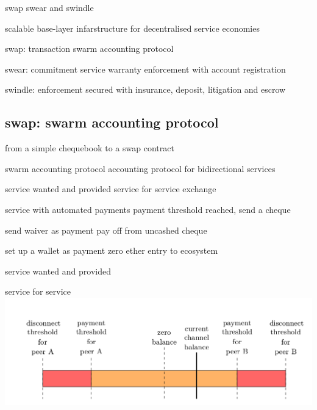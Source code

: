 \documentclass{beamer}
\begin{document}
\begin{frame}{swap swear and swindle}
\begin{block}{}
scalable base-layer infarstructure for decentralised service economies
\end{block}
\begin{block}{swap: transaction}
swarm accounting protocol
\end{block}
\begin{block}{swear: commitment}
service warranty enforcement with account registration
\end{block}
\begin{block}{swindle: enforcement}
secured with insurance, deposit, litigation and escrow
\end{block}
\end{frame}

\subsection[swap]{swap: swarm accounting protocol}
\begin{frame}{from a simple chequebook to a swap contract}
\begin{block}{swarm accounting protocol}
accounting protocol for bidirectional services
\end{block}
\begin{block}{service wanted and provided}
service for service exchange
\end{block}
\begin{block}{service with automated payments}
payment threshold reached, send a cheque
\end{block}
\begin{block}{send waiver as payment}
pay off from uncashed cheque
\end{block}
\begin{block}{set up a wallet as payment}
zero ether entry to ecosystem
\end{block}
\end{frame}

\begin{frame}{service wanted and provided}
\begin{block}{service for service}
\includegraphics[width=\textwidth]{swap.png}
\end{block}
\end{frame}
\end{document}
